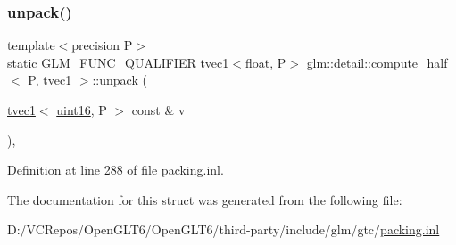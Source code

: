 \subsubsection{\texorpdfstring{unpack()}{unpack()}}
{\footnotesize\ttfamily template$<$precision P$>$ \\
static \mbox{\hyperlink{setup_8hpp_a33fdea6f91c5f834105f7415e2a64407}{G\+L\+M\+\_\+\+F\+U\+N\+C\+\_\+\+Q\+U\+A\+L\+I\+F\+I\+ER}} \mbox{\hyperlink{structglm_1_1tvec1}{tvec1}}$<$float, P$>$ \mbox{\hyperlink{structglm_1_1detail_1_1compute__half}{glm\+::detail\+::compute\+\_\+half}}$<$ P, \mbox{\hyperlink{structglm_1_1tvec1}{tvec1}} $>$\+::unpack (\begin{DoxyParamCaption}\item[{\mbox{\hyperlink{structglm_1_1tvec1}{tvec1}}$<$ \mbox{\hyperlink{namespaceglm_1_1detail_a47b2a7d006d187338e8031a352d1ce56}{uint16}}, P $>$ const \&}]{v }\end{DoxyParamCaption})\hspace{0.3cm}{\ttfamily [inline]}, {\ttfamily [static]}}



Definition at line 288 of file packing.\+inl.



The documentation for this struct was generated from the following file\+:\begin{DoxyCompactItemize}
\item 
D\+:/\+V\+C\+Repos/\+Open\+G\+L\+T6/\+Open\+G\+L\+T6/third-\/party/include/glm/gtc/\mbox{\hyperlink{packing_8inl}{packing.\+inl}}\end{DoxyCompactItemize}
